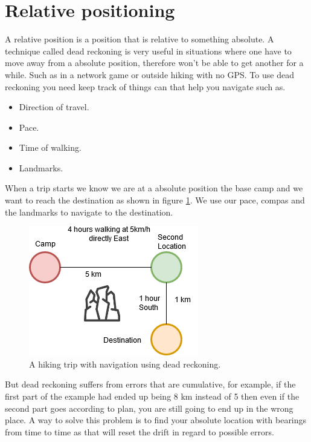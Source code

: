 \section{Relative positioning}
A relative position is a position that is relative to something absolute. A technique called dead reckoning is very useful in situations where one have to move away from a absolute position, therefore won't be able to get another for a while. Such as in a network game or outside hiking with no GPS. To use dead reckoning you need keep track of things can that help you navigate such as. 
\begin{itemize}
\item Direction of travel.
\item Pace.
\item Time of walking.
\item Landmarks.
\end{itemize}
When a trip starts we know we are at a absolute position the base camp and we want to reach the destination as shown in figure \ref{fig:deadrecdrawing}. We use our pace, compas and the landmarks to navigate to the destination.
\begin{figure}[H]
	\centering
	\includegraphics[width=0.4\linewidth]{positioning/positioning/deadRecDrawing}
	\caption{A hiking trip with navigation using dead reckoning.}
	\label{fig:deadrecdrawing}
\end{figure}
But dead reckoning suffers from errors that are cumulative, for example, if the first part of the example had ended up being 8 km instead of 5 then even if the second part goes according to plan, you are still going to end up in the wrong place. A way to solve this problem is to find your absolute location with bearings from time to time as that will reset the drift in regard to possible errors.